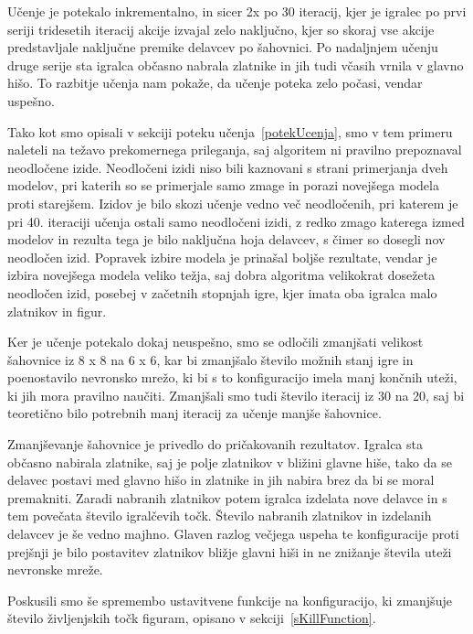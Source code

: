 \documentclass[a4paper, 12pt]{book}
\begin{document}
Učenje je potekalo inkrementalno, in sicer 2x po 30 iteracij, kjer je igralec po prvi seriji tridesetih iteracij akcije izvajal zelo naključno, kjer so skoraj vse akcije predstavljale naključne premike delavcev po šahovnici.
Po nadaljnjem učenju druge serije sta igralca občasno nabrala zlatnike in jih tudi včasih vrnila v glavno hišo.
To razbitje učenja nam pokaže, da učenje poteka zelo počasi, vendar uspešno.

Tako kot smo opisali v sekciji poteku učenja~\ref{potekUcenja}, smo v tem primeru naleteli na težavo prekomernega prileganja, saj algoritem ni pravilno prepoznaval neodločene izide.
Neodločeni izidi niso bili kaznovani s strani primerjanja dveh modelov, pri katerih so se primerjale samo zmage in porazi novejšega modela proti starejšem.
Izidov je bilo skozi učenje vedno več neodločenih, pri katerem je pri 40. iteraciji učenja ostali samo neodločeni izidi, z redko zmago katerega izmed modelov in rezulta tega je bilo naključna hoja delavcev, s čimer so dosegli nov neodločen izid.
Popravek izbire modela je prinašal boljše rezultate, vendar je izbira novejšega modela veliko težja, saj dobra algoritma velikokrat dosežeta neodločen izid, posebej v začetnih stopnjah igre, kjer imata oba igralca malo zlatnikov in figur.

Ker je učenje potekalo dokaj neuspešno, smo se odločili zmanjšati velikost šahovnice iz 8 x 8 na 6 x 6, kar bi zmanjšalo število možnih stanj igre in poenostavilo nevronsko mrežo, ki bi s to konfiguracijo imela manj končnih uteži, ki jih mora pravilno naučiti.
Zmanjšali smo tudi število iteracij iz 30 na 20, saj bi teoretično bilo potrebnih manj iteracij za učenje manjše šahovnice.

Zmanjševanje šahovnice je privedlo do pričakovanih rezultatov.
Igralca sta občasno nabirala zlatnike, saj je polje zlatnikov v bližini glavne hiše, tako da se delavec postavi med glavno hišo in zlatnike in jih nabira brez da bi se moral premakniti.
Zaradi nabranih zlatnikov potem igralca izdelata nove delavce in s tem povečata število igralčevih točk.
Število nabranih zlatnikov in izdelanih delavcev je še vedno majhno.
Glaven razlog večjega uspeha te konfiguracije proti prejšnji je bilo postavitev zlatnikov bližje glavni hiši in ne znižanje števila uteži nevronske mreže.


Poskusili smo še spremembo ustavitvene funkcije na konfiguracijo, ki zmanjšuje število življenjskih točk figuram, opisano v sekciji~\ref{sKillFunction}.
\end{document}

